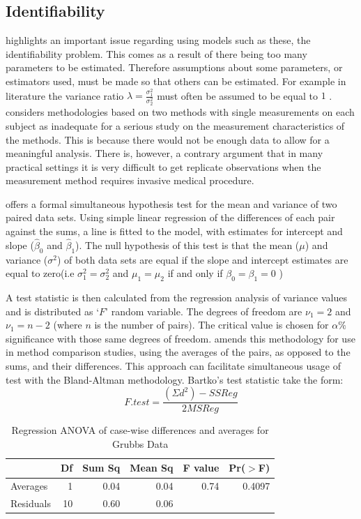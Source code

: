 \documentclass[12pt, a4paper]{report}
\theoremstyle{plain}
\theoremstyle{definition}
\theoremstyle{remark}
\begin{document}
\subsection{Identifiability}
\citet{DunnSEME} highlights an important issue regarding using
models such as these, the identifiability problem. This comes as a
result of there being too many parameters to be estimated.
Therefore assumptions about some parameters, or estimators used,
must be made so that others can be estimated. For example in literature the variance
ratio $\lambda=\frac{\sigma^{2}_{1}}{\sigma^{2}_{2}}$
must often be assumed to be equal to $1$ \citep{linnet98}.\citet{DunnSEME} considers methodologies based on two methods with single measurements on each subject as inadequate for a serious
study on the measurement characteristics of the methods. This is
because there would not be enough data to allow for a meaningful
analysis. There is, however, a contrary argument that in many
practical settings it is very difficult to get replicate
observations when the measurement method requires invasive medical
procedure.

\citet{BB89} offers a formal simultaneous hypothesis test for the
mean and variance of two paired data sets. Using simple linear
regression of the differences of each pair against the sums, a
line is fitted to the model, with estimates for intercept and
slope ($\hat{\beta}_{0}$ and $\hat{\beta}_{1}$). The null
hypothesis of this test is that the mean ($\mu$) and variance
($\sigma^{2}$) of both data sets are equal if the slope and
intercept estimates are equal to zero(i.e $\sigma^{2}_{1} =
\sigma^{2}_{2}$ and $\mu_{1}=\mu_{2}$ if and only if $\beta_{0}=
\beta_{1}=0$ )

A test statistic is then calculated from the regression analysis
of variance values \citep{BB89} and is distributed as `$F$' random
variable. The degrees of freedom are $\nu_{1}=2$ and $\nu_{1}=n-2$
(where $n$ is the number of pairs). The critical value is chosen
for $\alpha\%$ significance with those same degrees of freedom.
\citet{Bartko} amends this methodology for use in method
comparison studies, using the averages of the pairs, as opposed to
the sums, and their differences. This approach can facilitate
simultaneous usage of test with the Bland-Altman methodology.
Bartko's test statistic take the form:
\[ F.test = \frac{(\Sigma d^{2})-SSReg}{2MSReg}
\]
\begin{table}[ht]
\begin{center}
\begin{tabular}{lrrrrr}
  \hline
 & Df & Sum Sq & Mean Sq & F value & Pr($>$F) \\
  \hline
Averages & 1 & 0.04 & 0.04 & 0.74 & 0.4097 \\
  Residuals & 10 & 0.60 & 0.06 &  &  \\
   \hline
\end{tabular}
\caption{Regression ANOVA of case-wise differences and averages
for Grubbs Data}
\end{center}
\end{table}
\end{document}
